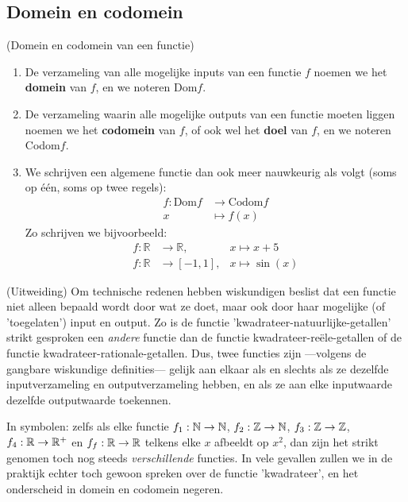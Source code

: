 \documentclass{ximera}
\begin{document}
\subsection{Domein en codomein}

 \begin{definition} (Domein en codomein van een functie)
    
    \begin{enumerate}
        \item De verzameling van alle mogelijke inputs van een functie $f$ noemen we het \textbf{domein} van $f$, en we noteren Dom$f$.
        \item De verzameling waarin alle mogelijke outputs van een functie moeten liggen noemen we het \textbf{codomein} van $f$, of ook wel het \textbf{doel} van $f$, en we noteren Codom$f$.
        \item We schrijven een algemene functie dan ook meer nauwkeurig als volgt (soms op één, soms op twee regels):
        \begin{align*}
        f: \text{Dom}f &\longrightarrow \text{Codom}f \\
        x &\longmapsto f(x)
        \end{align*}
        Zo schrijven we bijvoorbeeld:
        \begin{align*}
        f: \mathbb{R} &\longrightarrow \mathbb{R},         & x \longmapsto x+5  \\
        f: \mathbb{R} &\longrightarrow \left[-1,1\right],  & x \longmapsto \sin(x) 
        \end{align*}
    \end{enumerate}
\end{definition}

(Uitweiding) Om technische redenen hebben wiskundigen beslist dat een functie niet alleen bepaald wordt door wat ze doet, maar ook door haar mogelijke (of 'toegelaten') input en output. Zo is de functie 'kwadrateer-natuurlijke-getallen' strikt gesproken een \textit{andere} functie dan de functie kwadrateer-reële-getallen of de functie kwadrateer-rationale-getallen. Dus, twee functies zijn ---volgens de gangbare wiskundige definities--- gelijk aan elkaar als en slechts als ze dezelfde inputverzameling en outputverzameling hebben, en als ze aan elke inputwaarde dezelfde outputwaarde toekennen.

In symbolen: zelfs als elke functie
$f_1:\mathbb{N}\to\mathbb{N}$, $f_2:\mathbb{Z} \to\mathbb{N}$, $f_3:\mathbb{Z}\to\mathbb{Z}$, $f_4:\mathbb{R}\to\mathbb{R}^+$ en $f_f:\mathbb{R}\to\mathbb{R}$ telkens elke $x$ afbeeldt op $x^2$, dan zijn het strikt genomen toch nog steeds \textit{verschillende} functies. In vele gevallen zullen we in de praktijk echter toch gewoon spreken over de functie 'kwadrateer', en het onderscheid in domein en codomein negeren.
\end{document}
